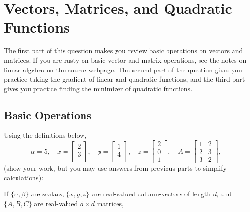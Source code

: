 \documentclass{article}
\begin{document}
\section{Vectors, Matrices, and Quadratic Functions}

The first part of this question makes you review basic operations on vectors and matrices. 
If you are rusty on basic vector and matrix operations, see the notes on linear algebra on the course webpage. 
The second part of the question gives you practice taking the gradient of linear and quadratic functions, 
and the third part gives you practice finding the minimizer of quadratic functions.

\subsection{Basic Operations}

\noindent Using the definitions below,
\[
\alpha = 5,\quad
x = \left[\begin{array}{c}
2\\
3\\
\end{array}\right], \quad 
y = \left[\begin{array}{c}
1\\
4\\
\end{array}\right],\quad
z = \left[\begin{array}{c}
2\\
0\\
1\end{array}\right],
\quad
A = \left[\begin{array}{ccc}
1 & 2\\
2 & 3\\
3 & 2
\end{array}\right],
\]
 (show your work, but you may use answers from previous parts to simplify calculations):\\

If $\{\alpha,\beta\}$ are scalars, $\{x,y,z\}$ are real-valued column-vectors of length $d$,
and $\{A,B,C\}$ are real-valued $d\times d$ matrices, 
\end{document}
